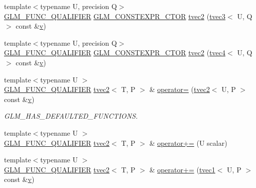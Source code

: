 \begin{DoxyCompactItemize}
\item 
{\footnotesize template$<$typename U, precision Q$>$ }\\\mbox{\hyperlink{setup_8hpp_a33fdea6f91c5f834105f7415e2a64407}{G\+L\+M\+\_\+\+F\+U\+N\+C\+\_\+\+Q\+U\+A\+L\+I\+F\+I\+ER}} \mbox{\hyperlink{setup_8hpp_ad34178a09666081abdb573c14d1f4a5a}{G\+L\+M\+\_\+\+C\+O\+N\+S\+T\+E\+X\+P\+R\+\_\+\+C\+T\+OR}} \mbox{\hyperlink{structglm_1_1tvec2_a3912fabf45f663470f74776ed1c32c15}{tvec2}} (\mbox{\hyperlink{structglm_1_1tvec3}{tvec3}}$<$ U, Q $>$ const \&\mbox{\hyperlink{glad_8h_a14cfbe2fc2234f5504618905b69d1e06}{v}})
\item 
{\footnotesize template$<$typename U, precision Q$>$ }\\\mbox{\hyperlink{setup_8hpp_a33fdea6f91c5f834105f7415e2a64407}{G\+L\+M\+\_\+\+F\+U\+N\+C\+\_\+\+Q\+U\+A\+L\+I\+F\+I\+ER}} \mbox{\hyperlink{setup_8hpp_ad34178a09666081abdb573c14d1f4a5a}{G\+L\+M\+\_\+\+C\+O\+N\+S\+T\+E\+X\+P\+R\+\_\+\+C\+T\+OR}} \mbox{\hyperlink{structglm_1_1tvec2_a5837d885dadb1fdca54974c65166a8b4}{tvec2}} (\mbox{\hyperlink{structglm_1_1tvec4}{tvec4}}$<$ U, Q $>$ const \&\mbox{\hyperlink{glad_8h_a14cfbe2fc2234f5504618905b69d1e06}{v}})
\item 
{\footnotesize template$<$typename U $>$ }\\\mbox{\hyperlink{setup_8hpp_a33fdea6f91c5f834105f7415e2a64407}{G\+L\+M\+\_\+\+F\+U\+N\+C\+\_\+\+Q\+U\+A\+L\+I\+F\+I\+ER}} \mbox{\hyperlink{structglm_1_1tvec2}{tvec2}}$<$ T, P $>$ \& \mbox{\hyperlink{structglm_1_1tvec2_af214e66acab4db6f5a539ff9a161e3ba}{operator=}} (\mbox{\hyperlink{structglm_1_1tvec2}{tvec2}}$<$ U, P $>$ const \&\mbox{\hyperlink{glad_8h_a14cfbe2fc2234f5504618905b69d1e06}{v}})
\begin{DoxyCompactList}\small\item\em G\+L\+M\+\_\+\+H\+A\+S\+\_\+\+D\+E\+F\+A\+U\+L\+T\+E\+D\+\_\+\+F\+U\+N\+C\+T\+I\+O\+NS. \end{DoxyCompactList}\item 
{\footnotesize template$<$typename U $>$ }\\\mbox{\hyperlink{setup_8hpp_a33fdea6f91c5f834105f7415e2a64407}{G\+L\+M\+\_\+\+F\+U\+N\+C\+\_\+\+Q\+U\+A\+L\+I\+F\+I\+ER}} \mbox{\hyperlink{structglm_1_1tvec2}{tvec2}}$<$ T, P $>$ \& \mbox{\hyperlink{structglm_1_1tvec2_a6c7476ec32ff4f21ace471d326a9be06}{operator+=}} (U scalar)
\item 
{\footnotesize template$<$typename U $>$ }\\\mbox{\hyperlink{setup_8hpp_a33fdea6f91c5f834105f7415e2a64407}{G\+L\+M\+\_\+\+F\+U\+N\+C\+\_\+\+Q\+U\+A\+L\+I\+F\+I\+ER}} \mbox{\hyperlink{structglm_1_1tvec2}{tvec2}}$<$ T, P $>$ \& \mbox{\hyperlink{structglm_1_1tvec2_a977134a069d9e6fec28d33204ed68019}{operator+=}} (\mbox{\hyperlink{structglm_1_1tvec1}{tvec1}}$<$ U, P $>$ const \&\mbox{\hyperlink{glad_8h_a14cfbe2fc2234f5504618905b69d1e06}{v}})

\end{DoxyCompactItemize}
